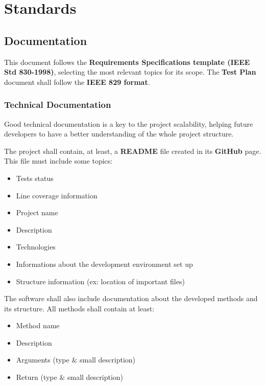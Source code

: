 \documentclass{scrreprt}
\begin{document}
\section{Standards}

\subsection{Documentation}

\par This document follows the \textbf{Requirements Specifications template (IEEE Std 830-1998)}, selecting the most relevant topics for its scope. The \textbf{Test Plan} document shall follow the \textbf{IEEE 829 format}.

\subsubsection{Technical Documentation}

\par Good technical documentation is a key to the project scalability, helping future developers to have a better understanding of the whole project structure.
\par The project shall contain, at least, a \textbf{README} file created in its \textbf{GitHub} page. This file must include some topics:

\begin{itemize}
\item Tests status
\item Line coverage information
\item Project name
\item Description
\item Technologies
\item Informations about the development environment set up
\item Structure information (ex: location of important files)
\end{itemize}

\par The software shall also include documentation about the developed methods and its structure. All methods shall contain at least:

\begin{itemize}
\item Method name
\item Description
\item Arguments (type \& small description)
\item Return (type \& small description)
\end{itemize}
\end{document}
